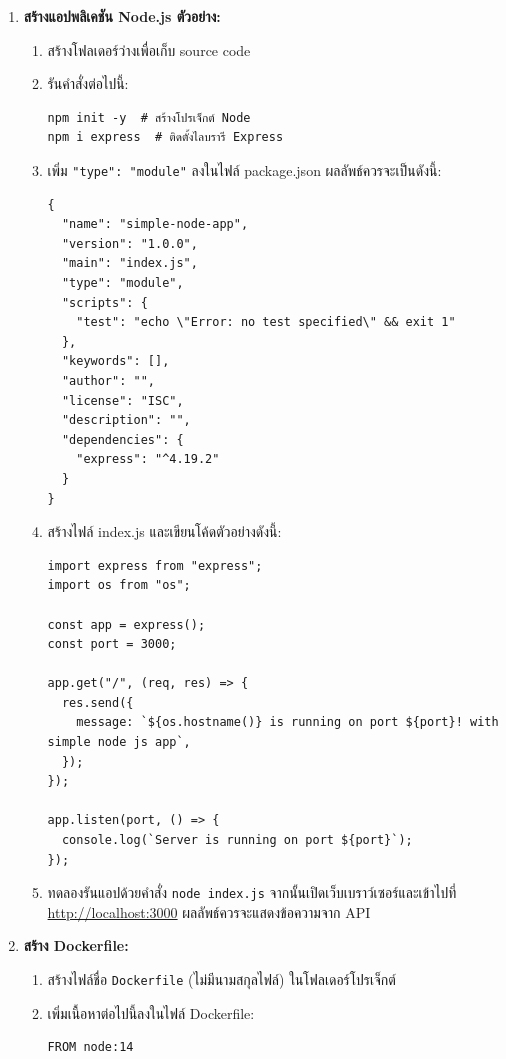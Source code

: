 \begin{enumerate}
    \item \textbf{สร้างแอปพลิเคชัน Node.js ตัวอย่าง:}
          \begin{enumerate}
              \item สร้างโฟลเดอร์ว่างเพื่อเก็บ source code
              \item รันคำสั่งต่อไปนี้:
                    \begin{verbatim}
npm init -y  # สร้างโปรเจ็กต์ Node
npm i express  # ติดตั้งไลบรารี Express
        \end{verbatim}
              \item เพิ่ม \texttt{"type": "module"} ลงในไฟล์ package.json ผลลัพธ์ควรจะเป็นดังนี้:
                    \begin{verbatim}
{
  "name": "simple-node-app",
  "version": "1.0.0",
  "main": "index.js",
  "type": "module",
  "scripts": {
    "test": "echo \"Error: no test specified\" && exit 1"
  },
  "keywords": [],
  "author": "",
  "license": "ISC",
  "description": "",
  "dependencies": {
    "express": "^4.19.2"
  }
}
        \end{verbatim}
                    \clearpage
              \item สร้างไฟล์ index.js และเขียนโค้ดตัวอย่างดังนี้:
                    \begin{verbatim}
import express from "express";
import os from "os";

const app = express();
const port = 3000;

app.get("/", (req, res) => {
  res.send({
    message: `${os.hostname()} is running on port ${port}! with simple node js app`,
  });
});

app.listen(port, () => {
  console.log(`Server is running on port ${port}`);
});
        \end{verbatim}
              \item ทดลองรันแอปด้วยคำสั่ง \texttt{node index.js} จากนั้นเปิดเว็บเบราว์เซอร์และเข้าไปที่ \url{http://localhost:3000} ผลลัพธ์ควรจะแสดงข้อความจาก API
          \end{enumerate}

    \item \textbf{สร้าง Dockerfile:}
          \begin{enumerate}
              \item สร้างไฟล์ชื่อ \texttt{Dockerfile} (ไม่มีนามสกุลไฟล์) ในโฟลเดอร์โปรเจ็กต์
              \item เพิ่มเนื้อหาต่อไปนี้ลงในไฟล์ Dockerfile:
                    \begin{verbatim}
FROM node:14


\end{verbatim}
\end{enumerate}
\end{enumerate}
